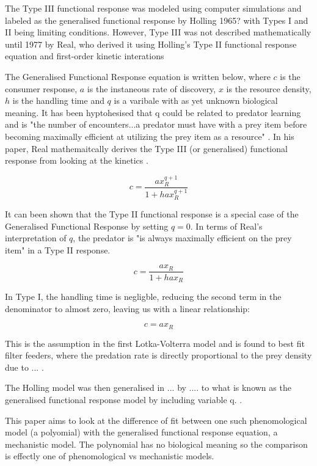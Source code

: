 \documentclass[11pt, a4paper, titlepage]{article}
\begin{document}
The Type III functional response was modeled using computer simulations and labeled as the generalised functional response by Holling 1965? with Types I and II being limiting conditions. However, Type III was not described mathematically until 1977 by Real, who derived it using Holling's Type II functional response equation and first-order kinetic interations \parencite{Real1977}
 
The Generalised Functional Response equation is written below, where $c$ is the consumer response, $a$ is the instaneous rate of discovery, $x$ is the resource density, $h$ is the handling time and $q$ is a varibale with as yet unknown biological meaning. It has been hyptohesised that q could be related to predator learning and is "the number of encounters...a predator must have with a prey item before becoming maximally efficient at utilizing the prey item as a resource" \parencite{Real1977}. In his paper, Real mathemaitcally derives the Type III (or generalised) functional response from looking at the kinetics \parencite{Real1977}.

\begin{equation}
c = \frac{ax_R^{q + 1}}{1 + hax_R^{q + 1}}
\end{equation}

It can been shown that the Type II functional response is a special case of the Generalised Functional Response by setting $q = 0$. In terms of Real's interpretation of $q$, the predator is "is always maximally efficient on the prey item"  \parencite{Real1977} in a Type II response.

\begin{equation}
c = \frac{ax_R}{1 + hax_R}
\end{equation}

 In Type I, the handling time is negligble, reducing the second term in the denominator to almost zero, leaving us with a linear relationship:

\begin{equation}
c = ax_R
\end{equation}

This is the assumption in the first Lotka-Volterra model and is found to best fit filter feeders, where the predation rate is directly  proportional to the prey density due to ... \parencite{Jescke2004}.

The Holling model was then generalised in ... 
by .... to what is known as the generalised functional response model by including variable q. . 

This paper aims to look at the difference of fit between one such phenomological model (a polyomial) with the generalised functional response equation, a mechanistic model. The polynomial has no biological meaning so the comparison is effectly one of phenomological vs mechanistic models. 
\end{document}
